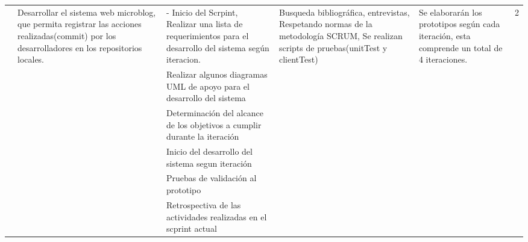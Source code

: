 \begin{center}
\begin{longtable}{|p{2cm}|p{2cm}|p{2cm}|p{2cm}|p{2cm}|p{1.3cm}|}
&\multirow{6}{2cm}{Desarrollar el sistema web microblog, que permita registrar las acciones realizadas(commit) por los desarrolladores en los repositorios locales.}&{- Inicio del Scrpint, Realizar una lista de requerimientos para el desarrollo del sistema según iteracion.}&\multirow{6}{2cm}{Busqueda bibliográfica, entrevistas, Respetando normas de la metodología SCRUM, Se realizan scripts de pruebas(unitTest y clientTest)}&\multirow{6}{2cm}{Se elaborarán los prototipos según cada iteración, esta comprende un total de 4 iteraciones.}&\multirow{2}{2cm}{2}\\\cline{3-3}

& &{Realizar algunos diagramas UML de apoyo para el desarrollo del sistema}&&&\\\cline{3-3}
& &{Determinación del alcance de los objetivos a cumplir durante la iteración}&&&\\\cline{3-3}
& &{Inicio del desarrollo del sistema segun iteración}&&&\\\cline{3-3}
& &{Pruebas de validación al prototipo}&&&\\\cline{3-3}
& &{Retrospectiva de las actividades realizadas en el scprint actual}&&&\\
\hline
\end{longtable}
\end{center}
